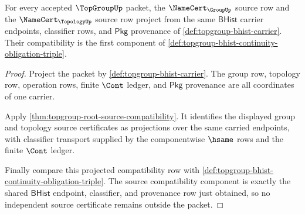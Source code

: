 \begin{theorem}
\label{thm:topgroup-source-projection-namecert-compatibility}
For every accepted $\TopGroupUp$ packet, the $\NameCert_{\GroupUp}$ source row
and the $\NameCert_{\TopologyUp}$ source row project from the same
$\mathsf{BHist}$ carrier endpoints, classifier rows, and $\mathsf{Pkg}$
provenance of \autoref{def:topgroup-bhist-carrier}. Their compatibility is the
first component of
\autoref{def:topgroup-bhist-continuity-obligation-triple}.
\end{theorem}
\begin{proof}
Project the packet by \autoref{def:topgroup-bhist-carrier}. The group row,
topology row, operation rows, finite $\Cont$ ledger, and $\mathsf{Pkg}$
provenance are all coordinates of one carrier.

Apply \autoref{thm:topgroup-root-source-compatibility}. It identifies the
displayed group and topology source certificates as projections over the same
carried endpoints, with classifier transport supplied by the componentwise
$\hsame$ rows and the finite $\Cont$ ledger.

Finally compare this projected compatibility row with
\autoref{def:topgroup-bhist-continuity-obligation-triple}. The source
compatibility component is exactly the shared $\mathsf{BHist}$ endpoint,
classifier, and provenance row just obtained, so no independent source
certificate remains outside the packet.
\end{proof}

